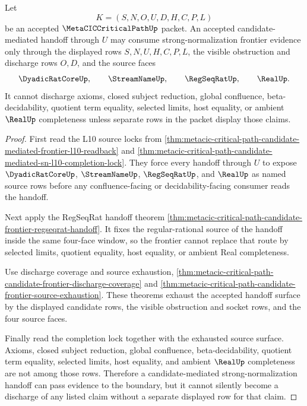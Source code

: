 \begin{theorem}
\label{thm:metacic-critical-path-candidate-frontier-axiom-frontier}
Let
$$
K=(S,N,O,U,D,H,C,P,L)
$$
be an accepted $\MetaCICCriticalPathUp$ packet. An accepted candidate-mediated handoff through $U$ may consume strong-normalization frontier evidence only through the displayed rows $S,N,U,H,C,P,L$, the visible obstruction and discharge rows $O,D$, and the source faces
$$
\DyadicRatCoreUp,\qquad
\StreamNameUp,\qquad
\RegSeqRatUp,\qquad
\RealUp .
$$
It cannot discharge axioms, closed subject reduction, global confluence, beta-decidability, quotient term equality, selected limits, host equality, or ambient $\RealUp$ completeness unless separate rows in the packet display those claims.
\end{theorem}
\begin{proof}
First read the L10 source locks from \autoref{thm:metacic-critical-path-candidate-mediated-frontier-l10-readback} and \autoref{thm:metacic-critical-path-candidate-mediated-sn-l10-completion-lock}. They force every handoff through $U$ to expose $\DyadicRatCoreUp$, $\StreamNameUp$, $\RegSeqRatUp$, and $\RealUp$ as named source rows before any confluence-facing or decidability-facing consumer reads the handoff.

Next apply the RegSeqRat handoff theorem \autoref{thm:metacic-critical-path-candidate-frontier-regseqrat-handoff}. It fixes the regular-rational source of the handoff inside the same four-face window, so the frontier cannot replace that route by selected limits, quotient equality, host equality, or ambient Real completeness.

Use discharge coverage and source exhaustion, \autoref{thm:metacic-critical-path-candidate-frontier-discharge-coverage} and \autoref{thm:metacic-critical-path-candidate-frontier-source-exhaustion}. These theorems exhaust the accepted handoff surface by the displayed candidate rows, the visible obstruction and socket rows, and the four source faces.

Finally read the completion lock together with the exhausted source surface. Axioms, closed subject reduction, global confluence, beta-decidability, quotient term equality, selected limits, host equality, and ambient $\RealUp$ completeness are not among those rows. Therefore a candidate-mediated strong-normalization handoff can pass evidence to the boundary, but it cannot silently become a discharge of any listed claim without a separate displayed row for that claim.
\end{proof}

